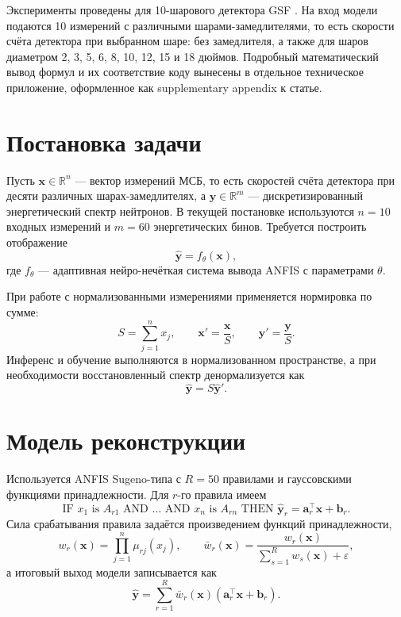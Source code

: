Эксперименты проведены для 10-шарового детектора GSF \cite{Compen_IAEA}. На вход модели подаются 10 измерений с различными шарами-замедлителями, то есть скорости счёта детектора при выбранном шаре: без замедлителя, а также для шаров диаметром 2, 3, 5, 6, 8, 10, 12, 15 и 18 дюймов. Подробный математический вывод формул и их соответствие коду вынесены в отдельное техническое приложение, оформленное как supplementary appendix к статье.

\section{Постановка задачи}

Пусть $\mathbf{x} \in \mathbb{R}^{n}$ --- вектор измерений МСБ, то есть скоростей счёта детектора при десяти различных шарах-замедлителях, а $\mathbf{y} \in \mathbb{R}^{m}$ --- дискретизированный энергетический спектр нейтронов. В текущей постановке используются $n=10$ входных измерений и $m=60$ энергетических бинов. Требуется построить отображение
\begin{equation}
\hat{\mathbf{y}} = f_{\theta}(\mathbf{x}),
\end{equation}
где $f_{\theta}$ --- адаптивная нейро-нечёткая система вывода ANFIS с параметрами $\theta$.

При работе с нормализованными измерениями применяется нормировка по сумме:
\begin{equation}
S = \sum_{j=1}^{n} x_j, \qquad \mathbf{x}' = \frac{\mathbf{x}}{S}, \qquad \mathbf{y}' = \frac{\mathbf{y}}{S}.
\end{equation}
Инференс и обучение выполняются в нормализованном пространстве, а при необходимости восстановленный спектр денормализуется как
\begin{equation}
\hat{\mathbf{y}} = S \hat{\mathbf{y}}'.
\end{equation}

\section{Модель реконструкции}

Используется ANFIS Sugeno-типа с $R=50$ правилами и гауссовскими функциями принадлежности. Для $r$-го правила имеем
\begin{equation}
\text{IF } x_1 \text{ is } A_{r1} \text{ AND } \dots \text{ AND } x_n \text{ is } A_{rn}
\text{ THEN } \hat{\mathbf{y}}_r = \mathbf{a}_r^{\top}\mathbf{x} + \mathbf{b}_r.
\end{equation}
Сила срабатывания правила задаётся произведением функций принадлежности,
\begin{equation}
w_r(\mathbf{x}) = \prod_{j=1}^{n} \mu_{rj}(x_j),
\qquad
\bar{w}_r(\mathbf{x}) = \frac{w_r(\mathbf{x})}{\sum_{s=1}^{R} w_s(\mathbf{x}) + \varepsilon},
\end{equation}
а итоговый выход модели записывается как
\begin{equation}
\hat{\mathbf{y}} = \sum_{r=1}^{R} \bar{w}_r(\mathbf{x}) \left(\mathbf{a}_r^{\top}\mathbf{x} + \mathbf{b}_r\right).
\end{equation}

